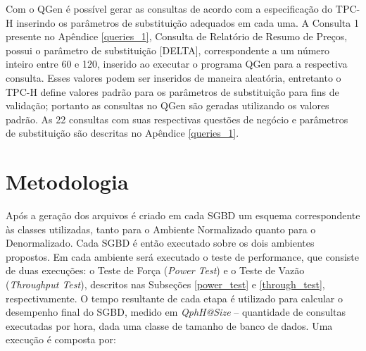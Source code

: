 Com o QGen é possível gerar as consultas de acordo com a especificação do TPC-H inserindo os parâmetros de substituição adequados em cada uma. A Consulta 1 presente no Apêndice \ref{queries_1}, Consulta de Relatório de Resumo de Preços, possui o parâmetro de substituição [DELTA], correspondente a um número inteiro entre 60 e 120, inserido ao executar o programa QGen para a respectiva consulta. Esses valores podem ser inseridos de maneira aleatória, entretanto o TPC-H define valores padrão para os parâmetros de substituição para fins de validação; portanto as consultas no QGen são geradas utilizando os valores padrão. As 22 consultas com suas respectivas questões de negócio e parâmetros de substituição são descritas no Apêndice \ref{queries_1}.

\section{Metodologia}
\label{metodologia}

Após a geração dos arquivos é criado em cada SGBD um esquema correspondente às classes utilizadas, tanto para o Ambiente Normalizado quanto para o Denormalizado. Cada SGBD é então executado sobre os dois ambientes propostos. Em cada ambiente será executado o teste de performance, que consiste de duas execuções: o Teste de Força (\textit{Power Test}) e o Teste de Vazão (\textit{Throughput Test}), descritos nas Subseções \ref{power_test} e \ref{through_test}, respectivamente. O tempo resultante de cada etapa é utilizado para calcular o desempenho final do SGBD, medido em \textit{QphH@Size} -- quantidade de consultas executadas por hora, dada uma classe de tamanho de banco de dados. Uma execução é composta por:

